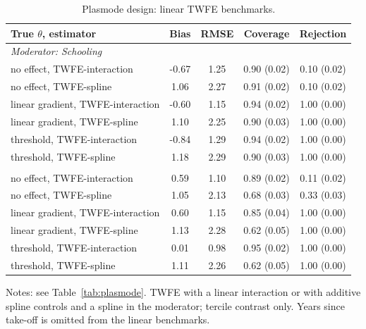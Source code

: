 \documentclass[preprint,12pt,authoryear]{elsarticle}
\begin{document}
\begin{table}[!ht]
\centering
\begin{threeparttable}
\caption{Plasmode design: linear TWFE benchmarks.}\label{tab:plasmodetwfe}
\scriptsize
\begin{tabular}{lcccc}
\toprule
True $\theta$, estimator & Bias & RMSE & Coverage & Rejection\\
\midrule
\multicolumn{5}{l}{\textit{Moderator: Schooling}}\\
\quad no effect, TWFE-interaction & -0.67 & 1.25 & 0.90 (0.02) & 0.10 (0.02)\\
\quad no effect, TWFE-spline & 1.06 & 2.27 & 0.91 (0.02) & 0.10 (0.02)\\
\quad linear gradient, TWFE-interaction & -0.60 & 1.15 & 0.94 (0.02) & 1.00 (0.00)\\
\quad linear gradient, TWFE-spline & 1.10 & 2.25 & 0.90 (0.03) & 1.00 (0.00)\\
\quad threshold, TWFE-interaction & -0.84 & 1.29 & 0.94 (0.02) & 1.00 (0.00)\\
\quad threshold, TWFE-spline & 1.18 & 2.29 & 0.90 (0.03) & 1.00 (0.00)\\
\addlinespace
\multicolumn{5}{l}{\textit{Moderator: Initial productivity}}\\
\quad no effect, TWFE-interaction & 0.59 & 1.10 & 0.89 (0.02) & 0.11 (0.02)\\
\quad no effect, TWFE-spline & 1.05 & 2.13 & 0.68 (0.03) & 0.33 (0.03)\\
\quad linear gradient, TWFE-interaction & 0.60 & 1.15 & 0.85 (0.04) & 1.00 (0.00)\\
\quad linear gradient, TWFE-spline & 1.13 & 2.28 & 0.62 (0.05) & 1.00 (0.00)\\
\quad threshold, TWFE-interaction & 0.01 & 0.98 & 0.95 (0.02) & 1.00 (0.00)\\
\quad threshold, TWFE-spline & 1.11 & 2.26 & 0.62 (0.05) & 1.00 (0.00)\\
\bottomrule
\end{tabular}
\begin{tablenotes}\scriptsize
\item Notes: see Table~\ref{tab:plasmode}. TWFE with a linear interaction or with additive spline controls and a spline in the moderator; tercile contrast only. Years since take-off is omitted from the linear benchmarks.
\end{tablenotes}
\end{threeparttable}
\end{table}
\end{document}

